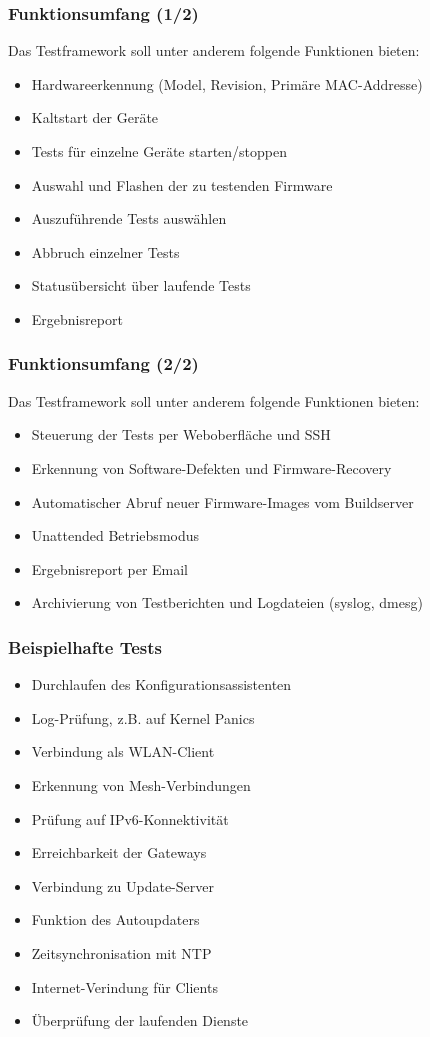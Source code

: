 \documentclass[accentcolor=tud6b,colorbacktitle,inverttitle,landscape,german,presentation,t]{tudbeamer}
\begin{document}
	\begin{frame}
		\frametitle{Funktionsumfang (1/2)}
		\vfill
		Das Testframework soll unter anderem folgende Funktionen bieten:
		\vfill
		\begin{itemize}
			\item Hardwareerkennung (Model, Revision, Primäre MAC-Addresse)
			\item Kaltstart der Geräte
			\item Tests für einzelne Geräte starten/stoppen
			\item Auswahl und Flashen der zu testenden Firmware
			\item Auszuführende Tests auswählen
			\item Abbruch einzelner Tests
			\item Statusübersicht über laufende Tests
			\item Ergebnisreport
		\end{itemize}	
	\end{frame}
	
	\begin{frame}
		\frametitle{Funktionsumfang (2/2)}
		\vfill
		Das Testframework soll unter anderem folgende Funktionen bieten:
		\vfill
		\begin{itemize}
			\item Steuerung der Tests per Weboberfläche und SSH
			\item Erkennung von Software-Defekten und Firmware-Recovery
			\item Automatischer Abruf neuer Firmware-Images vom Buildserver
			\item Unattended Betriebsmodus
			\item Ergebnisreport per Email
			\item Archivierung von Testberichten und Logdateien (syslog, dmesg)
		\end{itemize}	
	\end{frame}
	\begin{frame}
		\frametitle{Beispielhafte Tests}
		\begin{itemize}
		    \item Durchlaufen des Konfigurationsassistenten
		    \item Log-Prüfung, z.B. auf Kernel Panics
		    \item Verbindung als WLAN-Client
		    \item Erkennung von Mesh-Verbindungen
		    \item Prüfung auf IPv6-Konnektivität
		    \item Erreichbarkeit der Gateways
		    \item Verbindung zu Update-Server
		    \item Funktion des Autoupdaters
		    \item Zeitsynchronisation mit NTP
		    \item Internet-Verindung für Clients
		    \item Überprüfung der laufenden Dienste
 		\end{itemize}
	\end{frame}
\end{document}
